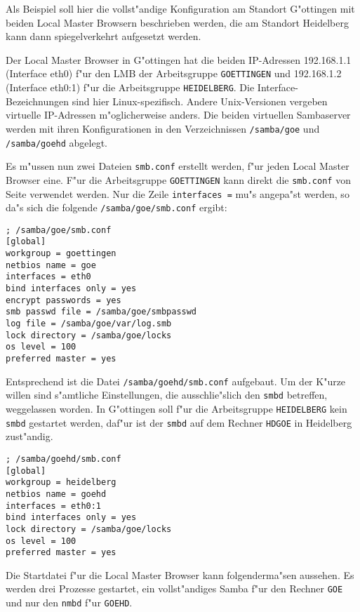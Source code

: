 \documentclass{scrartcl}\usepackage{pslatex}\typearea{12}
\newcommand{\prog}{\texttt}
\newcommand{\dateistyle}{\texttt}
\newcommand{\nbname}{\texttt}
\begin{document}
Als Beispiel soll hier die vollst"andige Konfiguration am Standort
G"ottingen mit beiden Local Master Browsern beschrieben werden, die am
Standort Heidelberg kann dann spiegelverkehrt aufgesetzt werden.

Der Local Master Browser in G"ottingen hat die beiden IP-Adressen
192.168.1.1 (Interface eth0) f"ur den LMB der Arbeitsgruppe
\nbname{GOETTINGEN} und 192.168.1.2 (Interface eth0:1) f"ur die
Arbeitsgruppe \nbname{HEIDELBERG}. Die Interface-Bezeichnungen sind
hier Linux-spezifisch. Andere Unix-Versionen vergeben virtuelle
IP-Adressen m"oglicherweise anders. Die beiden virtuellen Sambaserver
werden mit ihren Konfigurationen in den Verzeichnissen
\dateistyle{/samba/goe} und \dateistyle{/samba/goehd} abgelegt.

Es m"ussen nun zwei Dateien \dateistyle{smb.conf} erstellt werden,
f"ur jeden Local Master Browser eine. F"ur die Arbeitsgruppe
\nbname{GOETTINGEN} kann direkt die \dateistyle{smb.conf} von Seite
\pageref{smbconf-goe} verwendet werden. Nur die Zeile \prog{interfaces
  =} mu"s angepa"st werden, so da"s sich die folgende
\dateistyle{/samba/goe/smb.conf} ergibt:

\begin{verbatim}
; /samba/goe/smb.conf
[global]
workgroup = goettingen
netbios name = goe
interfaces = eth0
bind interfaces only = yes
encrypt passwords = yes 
smb passwd file = /samba/goe/smbpasswd
log file = /samba/goe/var/log.smb
lock directory = /samba/goe/locks
os level = 100
preferred master = yes
\end{verbatim}

Entsprechend ist die Datei \dateistyle{/samba/goehd/smb.conf}
aufgebaut. Um der K"urze willen sind s"amtliche Einstellungen, die
ausschlie"slich den \prog{smbd} betreffen, weggelassen worden. In
G"ottingen soll f"ur die Arbeitsgruppe \nbname{HEIDELBERG} kein
\prog{smbd} gestartet werden, daf"ur ist der \prog{smbd} auf dem
Rechner \nbname{HDGOE} in Heidelberg zust"andig.

\begin{verbatim}
; /samba/goehd/smb.conf
[global]
workgroup = heidelberg
netbios name = goehd
interfaces = eth0:1
bind interfaces only = yes
lock directory = /samba/goe/locks
os level = 100
preferred master = yes
\end{verbatim}

Die Startdatei f"ur die Local Master Browser kann folgenderma"sen
aussehen. Es werden drei Prozesse gestartet, ein vollst"andiges Samba
f"ur den Rechner \nbname{GOE} und nur den \prog{nmbd} f"ur
\prog{GOEHD}.
\end{document}
